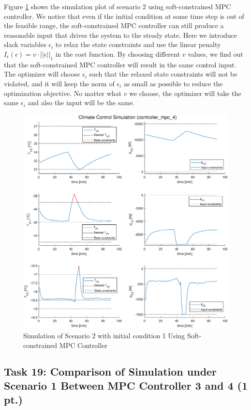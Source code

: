 \documentclass[a4paper,twoside,11pt]{article}
\numberwithin{equation}{section}
\begin{document}
Figure \ref{fig:16} shows the simulation plot of scenario 2 using soft-constrained MPC controller. We notice that even if the initial condition at some time step is out of the feasible range, the soft-constrained MPC controller can still produce a reasonable input that drives the system to the steady state. Here we introduce slack variables $\epsilon_i$ to relax the state constraints and use the linear penalty $I_\epsilon(\epsilon) = v \cdot ||\epsilon||_1$ in the cost function. By choosing different $v$ values, we find out that the soft-constrained MPC controller will result in the same control input. The optimizer will choose $\epsilon_i$ such that the relaxed state constraints will not be violated, and it will keep the norm of $\epsilon_i$ as small as possible to reduce the optimization objective. No matter what $v$ we choose, the optimizer will take the same $\epsilon_i$ and also the input will be the same. 

\begin{figure}[ht]
\centering
\includegraphics[scale = 0.58]{image/18.eps}
\caption{Simulation of Scenario 2 with initial condition 1 Using Soft-constrained MPC Controller}
\label{fig:16}
\end{figure}

\subsection{Task 19: Comparison of Simulation under Scenario 1 Between MPC Controller 3 and 4 (1 pt.)}
\end{document}
